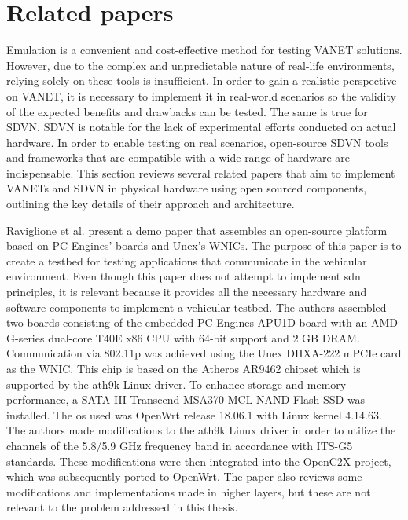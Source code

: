 \chapter{Related papers}
\label{cha:related_papers}

    Emulation is a convenient and cost-effective method for testing VANET solutions. However, due to the complex and unpredictable nature of real-life environments, relying solely on these tools is insufficient\cite{cardona_software-defined_2020}. In order to gain a realistic perspective on VANET, it is necessary to implement it in real-world scenarios so the validity of the expected benefits and drawbacks can be tested. The same is true for SDVN. 
    SDVN is notable for the lack of experimental efforts conducted on actual hardware. In order to enable testing on real scenarios, open-source SDVN tools and frameworks that are compatible with a wide range of hardware are indispensable\cite{cardona_software-defined_2020}. This section reviews several related papers that aim to implement VANETs and SDVN in physical hardware using open sourced components, outlining the key details of their approach and architecture. 
     
    Raviglione et al.\cite{raviglione_open_2019} present a demo paper that assembles an open-source platform based on PC Engines' boards and Unex's WNICs. The purpose of this paper is to create a testbed for testing applications that communicate in the vehicular environment. Even though this paper does not attempt to implement \gls{sdn} principles, it is relevant because it provides all the necessary hardware and software components to implement a vehicular testbed.
    The authors assembled two boards consisting of the embedded PC Engines APU1D board with an AMD G-series dual-core T40E x86 CPU with 64-bit support and 2 GB DRAM. Communication via 802.11p was achieved using the Unex DHXA-222 mPCIe card as the WNIC. This chip is based on the Atheros AR9462 chipset which is supported by the ath9k Linux driver. To enhance storage and memory performance, a SATA III Transcend MSA370 MCL NAND Flash SSD was installed.
    The \gls{os} used was OpenWrt release 18.06.1 with Linux kernel 4.14.63. The authors made modifications to the ath9k Linux driver in order to utilize the channels of the 5.8/5.9 GHz frequency band in accordance with ITS-G5 standards. These modifications were then integrated into the OpenC2X project, which was subsequently ported to OpenWrt. The paper also reviews some modifications and implementations made in higher layers, but these are not relevant to the problem addressed in this thesis.
    
